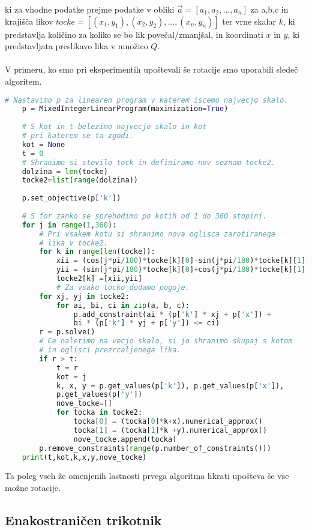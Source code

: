 \documentclass[a4paper, 12pt]{article}
\begin{document}
ki za vhodne podatke prejme podatke v obliki $\vec{a} = [a_1,a_2,...,a_n]$ za a,b,c in krajišča likov $tocke = [(x_1,y_1),(x_2,y_2),...,(x_n,y_n)]$ 
ter vrne skalar $k$, ki predstavlja količino za koliko se bo lik povečal/zmanjšal, in koordinati $x$ in $y$, ki predstavljata preslikavo lika v množico $Q$.
\\~\\
V primeru, ko smo pri eksperimentih upoštevali še rotacije smo uporabili sledeč algoritem.
\begin{lstlisting}[language=Python]
    # Nastavimo p za linearen program v katerem iscemo najvecjo skalo.
    p = MixedIntegerLinearProgram(maximization=True)
    
    # S kot in t belezimo najvecjo skalo in kot
    # pri katerem se ta zgodi.
    kot = None
    t = 0
    # Shranimo si stevilo tock in definiramo nov seznam tocke2.
    dolzina = len(tocke)
    tocke2=list(range(dolzina))
    
    p.set_objective(p['k'])
    
    # S for zanko se sprehodimo po kotih od 1 do 360 stopinj.
    for j in range(1,360):
        # Pri vsakem kotu si shranimo nova oglisca zarotiranega
        # lika v tocke2.
        for k in range(len(tocke)):
            xii = (cos(j*pi/180)*tocke[k][0]-sin(j*pi/180)*tocke[k][1])
            yii = (sin(j*pi/180)*tocke[k][0]+cos(j*pi/180)*tocke[k][1])
            tocke2[k] =[xii,yii]
            # Za vsako tocko dodamo pogoje.
        for xj, yj in tocke2:
            for ai, bi, ci in zip(a, b, c):
                p.add_constraint(ai * (p['k'] * xj + p['x']) +
                bi * (p['k'] * yj + p['y']) <= ci)
        r = p.solve()
        # Ce naletimo na vecjo skalo, si jo shranimo skupaj s kotom
        # in oglisci prezrcaljenega lika.
        if r > t:
            t = r
            kot = j
            k, x, y = p.get_values(p['k']), p.get_values(p['x']),
            p.get_values(p['y'])
            nove_tocke=[]
            for tocka in tocke2:
                tocka[0] = (tocka[0]*k+x).numerical_approx()
                tocka[1] = (tocka[1]*k +y).numerical_approx()
                nove_tocke.append(tocka)
        p.remove_constraints(range(p.number_of_constraints()))
    print(t,kot,k,x,y,nove_tocke)
\end{lstlisting}
Ta poleg vseh že omenjenih lastnosti prvega algoritma hkrati upošteva še vse možne rotacije.
\subsection{Enakostraničen trikotnik}
\end{document}
